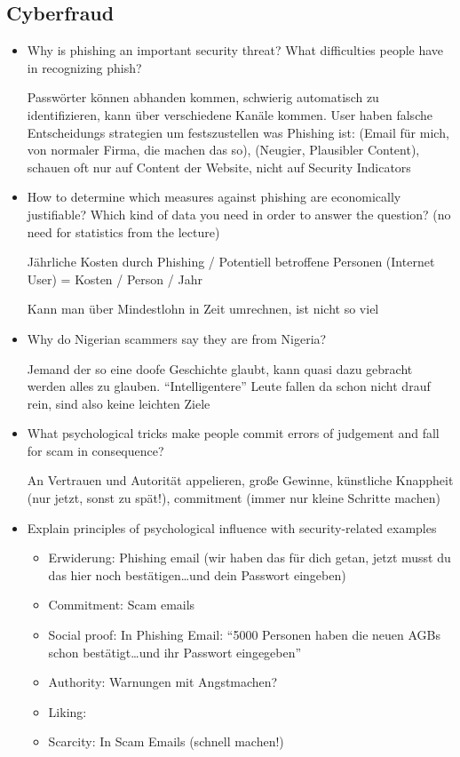 \subsection{Cyberfraud}
\begin{itemize}
	\item
		Why is phishing an important security threat? What difficulties people have in recognizing phish?

		Passwörter können abhanden kommen, schwierig automatisch zu identifizieren, kann über verschiedene Kanäle kommen.
		User haben falsche Entscheidungs strategien um festszustellen was Phishing ist: (Email für mich, von normaler Firma, die machen das so), (Neugier, Plausibler Content), schauen oft nur auf Content der Website, nicht auf Security Indicators
	\item
		How to determine which measures against phishing are economically justifiable? Which kind of data you need in order to answer the question? (no need for statistics from the lecture)

		Jährliche Kosten durch Phishing / Potentiell betroffene Personen (Internet User) = Kosten / Person / Jahr

		Kann man über Mindestlohn in Zeit umrechnen, ist nicht so viel
	\item
		Why do Nigerian scammers say they are from Nigeria?

		Jemand der so eine doofe Geschichte glaubt, kann quasi dazu gebracht werden alles zu glauben. \enquote{Intelligentere} Leute fallen da schon nicht drauf rein, sind also keine leichten Ziele
	\item
		What psychological tricks make people commit errors of judgement and fall for scam in consequence?

		An Vertrauen und Autorität appelieren, große Gewinne, künstliche Knappheit (nur jetzt, sonst zu spät!), commitment (immer nur kleine Schritte machen)
	\item
		Explain principles of psychological influence with security-related examples
		\begin{itemize}
			\item
				Erwiderung: Phishing email (wir haben das für dich getan, jetzt musst du das hier noch bestätigen\dots und dein Passwort eingeben)
			\item
				Commitment: Scam emails
			\item
				Social proof: In Phishing Email: \enquote{5000 Personen haben die neuen AGBs schon bestätigt\dots und ihr Passwort eingegeben}
			\item
				Authority: Warnungen mit Angstmachen?
			\item
				Liking: 
			\item
				Scarcity: In Scam Emails (schnell machen!)


\end{itemize}
\end{itemize}
